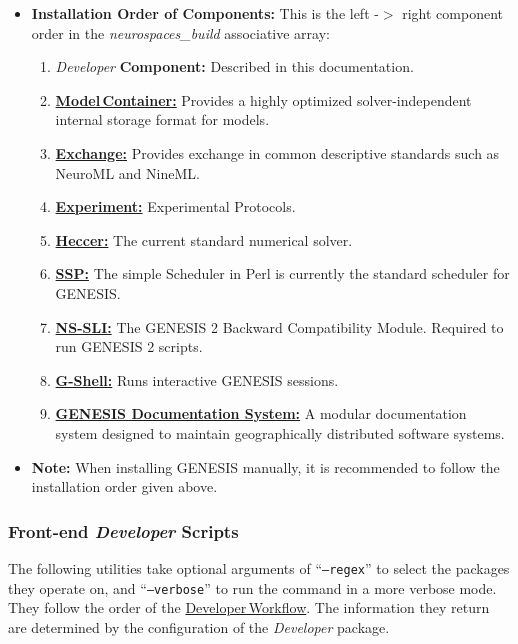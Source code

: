 \documentclass[12pt]{article}
\begin{document}
\begin{itemize}
   \item {\bf Installation Order of Components:} This is the left -$>$ right component order in the {\it neurospaces\_build} associative array:
   \begin{enumerate}
      \item {\it Developer} {\bf Component:} Described in this documentation.
      \item \href{../model-container/model-container.tex}{\bf Model\,Container:} Provides a highly optimized solver-independent internal storage format for models.
      \item \href{../exchange/exchange.tex}{\bf Exchange:} Provides exchange in common descriptive standards such as NeuroML and NineML.
      \item \href{../experiment/experiment.tex}{\bf Experiment:} Experimental Protocols.
      \item \href{../heccer/heccer.tex}{\bf Heccer:} The current standard numerical solver.
      \item \href{../ssp/ssp.tex}{\bf SSP:} The simple Scheduler in Perl is currently the standard scheduler for GENESIS.
      \item \href{../ns-sli/ns-sli.tex}{\bf NS-SLI:} The GENESIS 2 Backward Compatibility Module. Required to run GENESIS 2 scripts.
      \item \href{../gshell/gshell.tex}{\bf G-Shell:} Runs interactive GENESIS sessions.
      \item \href{../documentation-overview/documentation-overview.tex}{\bf GENESIS Documentation System:} A modular documentation system designed to maintain geographically distributed software systems.
   \end{enumerate}
   \item {\bf Note:} When installing GENESIS manually, it is recommended to follow the installation order given above. 
\end{itemize}


\subsubsection*{Front-end {\it Developer} Scripts}

The following utilities take optional arguments of ``{\tt --regex}'' to select the packages they operate on, and ``{\tt --verbose}'' to run the command in a more verbose mode. They follow the order of the \href{../workflow-developer/workflow-developer.tex}{Developer\,Workflow}. The information they return are determined by the configuration of the {\it Developer} package.
\end{document}
